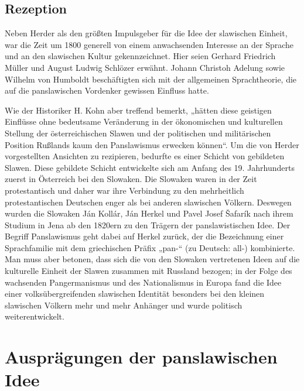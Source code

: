 \documentclass[12pt,headsepline,a4paper]{scrartcl}
\begin{document}
\subsection{Rezeption}
Neben Herder als den größten Impulsgeber für die Idee der slawischen Einheit, war die Zeit
um 1800 generell von einem anwachsenden Interesse an der Sprache und an den slawischen
Kultur gekennzeichnet. Hier seien Gerhard Friedrich Müller und August Ludwig Schlözer erwähnt. Johann
Christoh Adelung sowie Wilhelm von Humboldt beschäftigten sich mit der allgemeinen
Sprachtheorie, die auf die panslawischen Vordenker gewissen Einfluss hatte.\autocite{osterrieder}

Wie der Historiker H. Kohn\autocite[9]{kohn} aber treffend bemerkt, „hätten diese geistigen Einflüsse
ohne bedeutsame Veränderung in der ökonomischen und kulturellen Stellung der
österreichischen Slawen und der politischen und militärischen Position Rußlands kaum den
Panslawismus erwecken können“. Um die von Herder vorgestellten Ansichten zu rezipieren,
bedurfte es einer Schicht von gebildeten Slawen. Diese gebildete Schicht entwickelte sich am
Anfang des 19. Jahrhunderts zuerst in Österreich bei den Slowaken. Die Slowaken waren in
der Zeit protestantisch und daher war ihre Verbindung zu den mehrheitlich protestantischen
Deutschen enger als bei anderen slawischen Völkern. Deswegen wurden die Slowaken Ján
Kollár, Ján Herkel und Pavel Josef Šafarík nach ihrem Studium in Jena ab den 1820ern zu den
Trägern der panslawistischen Idee.\autocite[1]{orton} Der Begriff Panslawismus geht dabei auf
Herkel zurück, der die Bezeichnung einer Sprachfamilie mit dem griechischen Präfix „pan-“
(zu Deutsch: all-) kombinierte. Man muss aber betonen, dass sich die von den Slowaken
vertretenen Ideen auf die kulturelle Einheit der Slawen zusammen mit Russland bezogen; in
der Folge des wachsenden Pangermanismus und des Nationalismus in Europa fand die Idee
einer volksübergreifenden slawischen Identität besonders bei den kleinen slawischen Völkern
mehr und mehr Anhänger und wurde politisch weiterentwickelt.
\section{Ausprägungen der panslawischen Idee}
\end{document}
